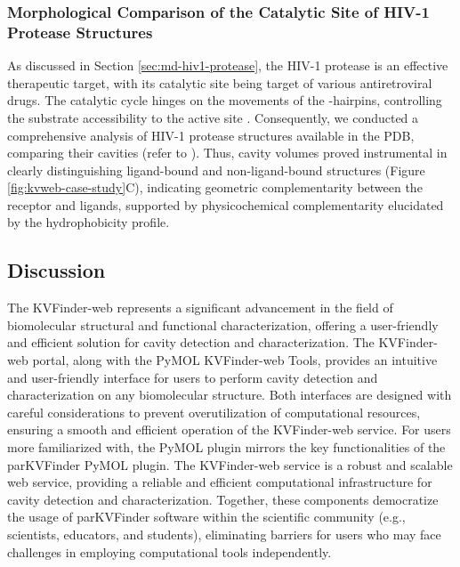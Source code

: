 \documentclass[Ingles]{phdthesis}
\def\eg{e.g.\onedot}
\begin{document}
\subsubsection{Morphological Comparison of the Catalytic Site of HIV-1 Protease Structures \label{sec:kvweb-hiv1-protease-morphological}}

As discussed in Section \ref{sec:md-hiv1-protease}, the \acs{HIV-1} protease is an effective therapeutic target, with its catalytic site being target of various antiretroviral drugs. The catalytic cycle hinges on the movements of the \textbeta-hairpins, controlling the substrate accessibility to the active site \cite{lam1994,soares2016}. Consequently, we conducted a comprehensive analysis of \acs{HIV-1} protease structures available in the \acs{PDB}, comparing their cavities (refer to \cite{guerra2023A}). Thus, cavity volumes proved instrumental in clearly distinguishing ligand-bound and non-ligand-bound structures (Figure \ref{fig:kvweb-case-study}C), indicating geometric complementarity between the receptor and ligands, supported by physicochemical complementarity elucidated by the hydrophobicity profile.

\subsection{Discussion}

The KVFinder-web represents a significant advancement in the field of biomolecular structural and functional characterization, offering a user-friendly and efficient solution for cavity detection and characterization. The KVFinder-web portal, along with the PyMOL KVFinder-web Tools, provides an intuitive and user-friendly interface for users to perform cavity detection and characterization on any biomolecular structure. Both interfaces are designed with careful considerations to prevent overutilization of computational resources, ensuring a smooth and efficient operation of the KVFinder-web service. For users more familiarized with, the PyMOL plugin mirrors the key functionalities of the parKVFinder PyMOL plugin. The KVFinder-web service is a robust and scalable web service, providing a reliable and efficient computational infrastructure for cavity detection and characterization. Together, these components democratize the usage of parKVFinder software within the scientific community (\eg, scientists, educators, and students), eliminating barriers for users who may face challenges in employing computational tools independently.
\end{document}
